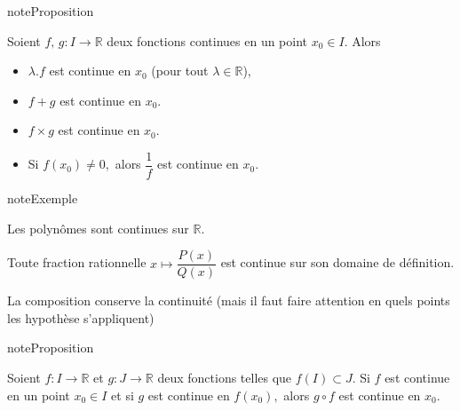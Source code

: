 \documentclass[letterpaper,10pt,french]{jupyterBook}
\begin{document}
\begin{sphinxadmonition}{note}{Proposition}

\sphinxAtStartPar
Soient \(f,\,g:I\rightarrow\mathbb{R}\) deux fonctions continues en un point \(x_0\in I.\) Alors
\begin{itemize}
\item {} 
\sphinxAtStartPar
\(\lambda.f\) est continue en \(x_0\) (pour tout \(\lambda\in \mathbb{R}\)),

\item {} 
\sphinxAtStartPar
\(f+g\) est continue en \(x_0.\)

\item {} 
\sphinxAtStartPar
\(f\times g\) est continue en \(x_0.\)

\item {} 
\sphinxAtStartPar
Si \(f(x_0)\neq0,\) alors \(\dfrac{1}{f}\) est continue en \(x_0.\)

\end{itemize}
\end{sphinxadmonition}

\begin{sphinxadmonition}{note}{Exemple}

\sphinxAtStartPar
Les polynômes sont continues sur \(\mathbb{R}.\)

\sphinxAtStartPar
Toute fraction rationnelle \(x\mapsto\dfrac{P(x)}{Q(x)}\) est continue sur son domaine de définition.
\end{sphinxadmonition}

\sphinxAtStartPar
La composition conserve la continuité (mais il faut faire attention en quels points les hypothèse s’appliquent)

\begin{sphinxadmonition}{note}{Proposition}

\sphinxAtStartPar
Soient \(f:I\rightarrow\mathbb{R}\) et \(g:J\rightarrow\mathbb{R}\) deux fonctions telles que \(f(I)\subset J.\) Si \(f\) est continue en un point \(x_0\in I\) et si \(g\) est continue en \(f(x_0),\) alors \(g\circ f\) est continue en \(x_0.\)
\end{sphinxadmonition}
\end{document}
